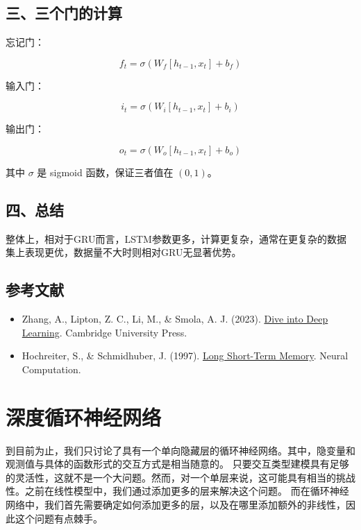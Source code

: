 \hypertarget{ux4e09ux4e09ux4e2aux95e8ux7684ux8ba1ux7b97}{%
\subsection{三、三个门的计算}\label{ux4e09ux4e09ux4e2aux95e8ux7684ux8ba1ux7b97}}

忘记门：

\[
f_t = \sigma(W_f [h_{t-1}, x_t] + b_f)
\]

输入门：

\[
i_t = \sigma(W_i [h_{t-1}, x_t] + b_i)
\]

输出门：

\[
o_t = \sigma(W_o [h_{t-1}, x_t] + b_o)
\]

其中 \(\sigma\) 是 sigmoid 函数，保证三者值在 \((0,1)\)。

\hypertarget{ux56dbux603bux7ed3}{%
\subsection{四、总结}\label{ux56dbux603bux7ed3}}

整体上，相对于GRU而言，LSTM参数更多，计算更复杂，通常在更复杂的数据集上表现更优，数据量不大时则相对GRU无显著优势。

\hypertarget{ux53c2ux8003ux6587ux732e-21}{%
\subsection{参考文献}\label{ux53c2ux8003ux6587ux732e-21}}

\vspace{0.25em}
\begin{itemize}
\tightlist
\item
  Zhang, A., Lipton, Z. C., Li, M., \& Smola, A. J. (2023). \href{https://D2L.ai}{Dive into Deep Learning}. Cambridge University Press.
\item
  Hochreiter, S., \& Schmidhuber, J. (1997). \href{https://doi.org/10.1162/neco.1997.9.8.1735}{Long Short-Term Memory}. Neural Computation.
\end{itemize}

\clearpage

\hypertarget{ux6df1ux5ea6ux5faaux73afux795eux7ecfux7f51ux7edc}{%
\section{深度循环神经网络}\label{ux6df1ux5ea6ux5faaux73afux795eux7ecfux7f51ux7edc}}

到目前为止，我们只讨论了具有一个单向隐藏层的循环神经网络。其中，隐变量和观测值与具体的函数形式的交互方式是相当随意的。 只要交互类型建模具有足够的灵活性，这就不是一个大问题。然而，对一个单层来说，这可能具有相当的挑战性。之前在线性模型中，我们通过添加更多的层来解决这个问题。 而在循环神经网络中，我们首先需要确定如何添加更多的层，以及在哪里添加额外的非线性，因此这个问题有点棘手。

